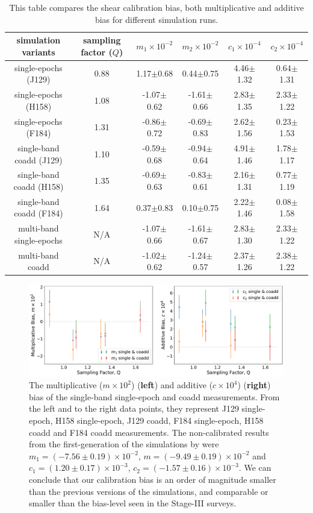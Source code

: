 \documentclass[fleqn,usenatbib]{mnras}
\begin{document}
\begin{table}
	\centering
	\begin{tabular}[width=\textwidth]{ c|c|c|c|c|c } 
		\hline
		simulation variants & sampling factor ($Q$) & $m_{1}\times10^{-2}$ & $m_{2}\times10^{-2}$ & $c_{1}\times10^{-4}$ & $c_{2}\times10^{-4}$\\
		\hline
		single-epochs (J129) & 0.88 & 1.17$\pm$0.68 & 0.44$\pm$0.75 & 4.46$\pm$1.32 & 0.64$\pm$1.31\\
		single-epochs (H158) & 1.08 & -1.07$\pm$0.62 & -1.61$\pm$0.66 & 2.83$\pm$1.35 & 2.33$\pm$1.22\\
		single-epochs (F184) & 1.31 & -0.86$\pm$0.72 & -0.69$\pm$0.83 & 2.62$\pm$1.56 & 0.23$\pm$1.53\\
		\hline
		single-band coadd (J129) & 1.10 & -0.59$\pm$0.68 & -0.94$\pm$0.64 & 4.91$\pm$1.46 & 1.78$\pm$1.17\\
		single-band coadd (H158) & 1.35 & -0.69$\pm$0.63 & -0.83$\pm$0.61 & 2.16$\pm$1.31 & 0.77$\pm$1.19\\
		single-band coadd (F184) & 1.64 & 0.37$\pm$0.83 & 0.10$\pm$0.75 & 2.22$\pm$1.46 & 0.08$\pm$1.58\\
		\hline
		multi-band single-epochs & N/A & -1.07$\pm$0.66 & -1.61$\pm$0.67 & 2.83$\pm$1.30 & 2.33$\pm$1.22 \\
		multi-band coadd & N/A & -1.02$\pm$0.62 & -1.24$\pm$0.57 & 2.37$\pm$1.26 & 2.38$\pm$1.22\\
		
		\hline
	\end{tabular}
	\caption{This table compares the shear calibration bias, both multiplicative and additive bias for different simulation runs.}
	\label{tab:bias_summary}
\end{table}

\begin{figure}
	\includegraphics[width=\textwidth]{final_result_v4.pdf}
    \caption{The multiplicative ($m \times 10^2$) (\textbf{left}) and additive ($c \times 10^4$) (\textbf{right}) bias of the single-band single-epoch and coadd measurements. From the left and to the right data points, they represent J129 single-epoch, H158 single-epoch, J129 coadd, F184 single-epoch, H158 coadd and F184 coadd measurements. The non-calibrated results from the first-generation of the simulations by \cite{2021MNRAS.501.2044T} were $m_1=(-7.56\pm0.19)\times10^{-2}$, $m=(-9.49\pm0.19)\times10^{-2}$ and $c_1=(1.20\pm0.17)\times10^{-3}$, $c_2=(-1.57\pm0.16)\times10^{-3}$. We can conclude that our calibration bias is an order of magnitude smaller than the previous versions of the simulations, and comparable or smaller than the bias-level seen in the Stage-III surveys.}
    \label{fig:final_result}
\end{figure}
\end{document}
